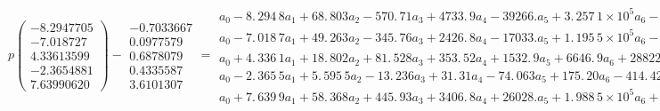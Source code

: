 \documentclass{article}
\begin{document}
$p(%
\begin{array}{c}
-8.2947705 \\ 
-7.018727 \\ 
4.33613599 \\ 
-2.3654881 \\ 
7.63990620%
\end{array}%
)-%
\begin{array}{c}
-0.7033667 \\ 
0.0977579 \\ 
0.6878079 \\ 
0.4335587 \\ 
3.6101307%
\end{array}%
=\allowbreak 
\begin{array}{c}
a_{0}-8.\,\allowbreak 294\,8a_{1}+68.\,\allowbreak
803a_{2}-570.\,\allowbreak 71a_{3}+4733.\,\allowbreak
9a_{4}-39266.a_{5}+3.\,\allowbreak 257\,1\times 10^{5}a_{6}-2.\,\allowbreak
701\,7\times 10^{6}a_{7}+2.\,\allowbreak 241\,0\times
10^{7}a_{8}-1.\,\allowbreak 858\,8\times 10^{8}a_{9}+0.703\,37 \\ 
a_{0}-7.\,\allowbreak 018\,7a_{1}+49.\,\allowbreak
263a_{2}-345.\,\allowbreak 76a_{3}+2426.\,\allowbreak
8a_{4}-17033.a_{5}+1.\,\allowbreak 195\,5\times 10^{5}a_{6}-8.\,\allowbreak
390\,9\times 10^{5}a_{7}+5.\,\allowbreak 889\,3\times
10^{6}a_{8}-4.\,\allowbreak 133\,6\times 10^{7}a_{9}-9.\,\allowbreak
775\,8\times 10^{-2} \\ 
a_{0}+4.\,\allowbreak 336\,1a_{1}+18.\,\allowbreak 802a_{2}+81.\,\allowbreak
528a_{3}+353.\,\allowbreak 52a_{4}+1532.\,\allowbreak
9a_{5}+6646.\,\allowbreak 9a_{6}+28822.a_{7}+1.\,\allowbreak 249\,8\times
10^{5}a_{8}+5.\,\allowbreak 419\,1\times 10^{5}a_{9}-0.687\,81 \\ 
a_{0}-2.\,\allowbreak 365\,5a_{1}+5.\,\allowbreak
595\,5a_{2}-13.\,\allowbreak 236a_{3}+31.\,\allowbreak
31a_{4}-74.\,\allowbreak 063a_{5}+175.\,\allowbreak
20a_{6}-414.\,\allowbreak 42a_{7}+980.\,\allowbreak
32a_{8}-2318.\,\allowbreak 9a_{9}-0.433\,56 \\ 
a_{0}+7.\,\allowbreak 639\,9a_{1}+58.\,\allowbreak
368a_{2}+445.\,\allowbreak 93a_{3}+3406.\,\allowbreak
8a_{4}+26028.a_{5}+1.\,\allowbreak 988\,5\times 10^{5}a_{6}+1.\,\allowbreak
519\,2\times 10^{6}a_{7}+1.\,\allowbreak 160\,7\times
10^{7}a_{8}+8.\,\allowbreak 867\,3\times 10^{7}a_{9}-3.\,\allowbreak 610\,1%
\end{array}%
\allowbreak =\allowbreak $
\end{document}

